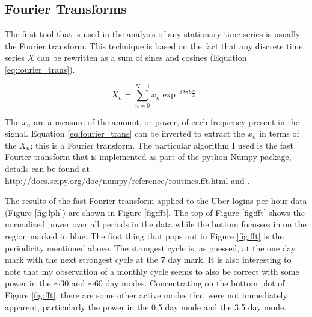 \documentclass{tufte-handout}
\begin{document}
\subsection{Fourier Transforms}

The first tool that is used in the analysis of any stationary time series is usually the Fourier transform. This technique is based on the fact that any discrete time series $X$ can be rewritten as a sum of sines and cosines (Equation \ref{eq:fourier_trans}).

\begin{equation}
        X_n = \sum_{n=0}^{N-1} x_n \exp^{-i2\pi k \frac{n}{N}}
        \label{eq:fourier_trans}.
\end{equation}

\noindent The $x_n$ are a measure of the amount, or power, of each frequency present in the signal. Equation \ref{eq:fourier_trans} can be inverted to extract the $x_n$ in terms of the $X_n$; this is a Fourier transform. The particular algorithm I used is the fast Fourier transform that is implemented as part of the python Numpy package, details can be found at \url{http://docs.scipy.org/doc/numpy/reference/routines.fft.html} and \citet{cooleyT65, pressTVF07}.

The results of the fast Fourier transform applied to the Uber logins per hour data (Figure \ref{fig:lph}) are shown in Figure \ref{fig:fft}. The top of Figure \ref{fig:fft} shows the normalized power over all periods in the data while the bottom focusses in on the region marked in blue. The first thing that pops out in Figure \ref{fig:fft} is the periodicity mentioned above. The strongest cycle is, as guessed, at the one day mark with the next strongest cycle at the 7 day mark. It is also interesting to note that my observation of a monthly cycle seems to also be correct with some power in the $\sim$30 and $\sim$60 day modes. Concentrating on the bottom plot of Figure \ref{fig:fft}, there are some other active modes that were not immediately apparent, particularly the power in the 0.5 day mode and the 3.5 day mode.
\end{document}
